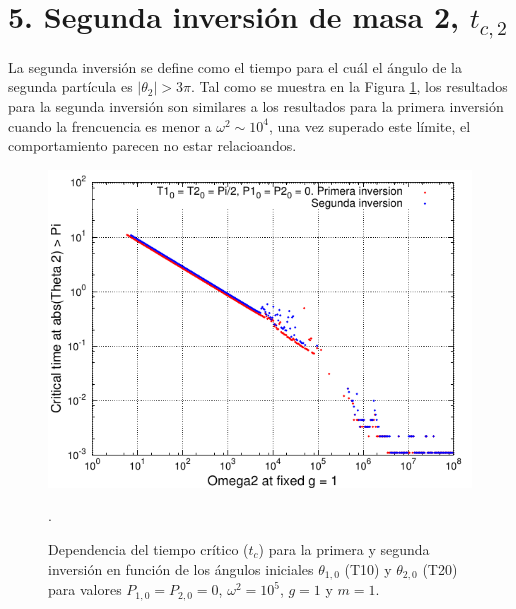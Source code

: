\documentclass[10pt,letterpaper]{article}
\begin{document}
\section*{5. Segunda inversión de masa 2, $t_{c,2}$}
La segunda inversión se define como el tiempo para el cuál el ángulo de la  segunda partícula es $|\theta_2| > 3\pi$. Tal como se muestra en la Figura \ref{Fig-SegInversion}, los resultados para la segunda inversión son similares a los resultados para la primera inversión cuando la frencuencia es menor a $\omega^2 \sim 10^4$, una vez superado este límite, el comportamiento parecen no estar relacioandos.  
\begin{figure}
\centering
\includegraphics[scale=1.5]{2Grafica_TCritico_L.pdf}
\caption{Dependencia del tiempo crítico ($t_c$) para la primera y segunda inversión en función de los ángulos iniciales $\theta_{1,0}$ (T10) y $\theta_{2,0}$ (T20) para valores $P_{1,0} = P_{2,0} = 0$, $\omega^2 = 10^5$, $g=1$ y $m=1$.}\label{Fig-SegInversion}.
\end{figure}
\end{document}
